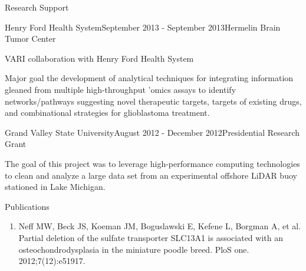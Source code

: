 \documentclass{resume} %
\begin{document}

\begin{rSection}{Research Support}
\begin{rSubsection}{Henry Ford Health System}{September 2013 - September 2013}{Hermelin Brain Tumor Center}{}
\item VARI collaboration with Henry Ford Health System
\item Major goal the development of analytical techniques for integrating information gleaned from multiple high-throughput ’omics assays to identify networks/pathways suggesting novel therapeutic targets, targets of existing drugs, and combinational strategies for glioblastoma treatment.
\end{rSubsection}

\begin{rSubsection}{Grand Valley State University}{August 2012 - December 2012}{Presidential Research Grant}{}
\item The goal of this project was to leverage high-performance computing technologies to clean and analyze a large data set from an experimental offshore LiDAR buoy stationed in Lake Michigan.
\end{rSubsection}

\end{rSection}


\begin{rSection}{Publications}
\begin{enumerate}
\item Neff MW, Beck JS, Koeman JM, Boguslawski E, Kefene L, Borgman A, et al. Partial deletion of the sulfate transporter SLC13A1 is associated with an osteochondrodysplasia in the miniature poodle breed. PloS one. 2012;7(12):e51917.
\end{enumerate}
\end{rSection}

\end{document}
